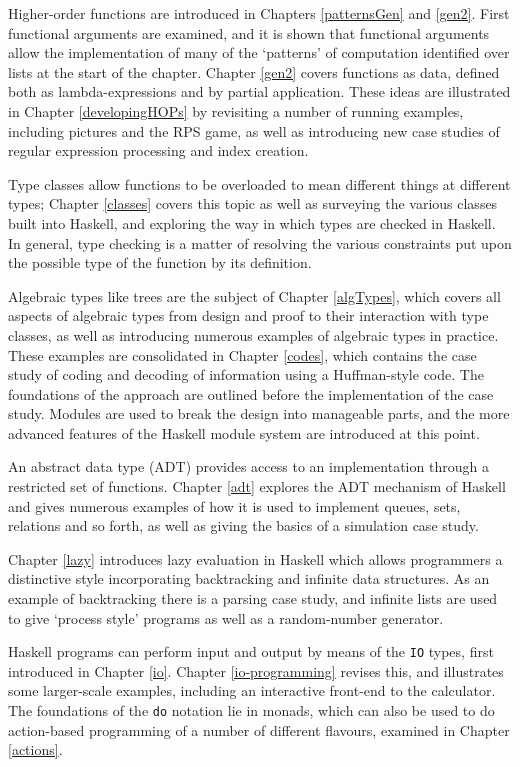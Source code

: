 Higher-order functions are introduced in Chapters \ref{patternsGen} and \ref{gen2}. First
functional arguments are examined, and it is shown that functional
arguments allow the implementation of many of the `patterns' of
computation identified over lists at the start of the chapter. Chapter
\ref{gen2} covers functions as data, defined both as lambda-expressions and
by partial application. These ideas are illustrated in Chapter \ref{developingHOPs} by revisiting a number of running examples, including pictures and the RPS game, as well as introducing new case studies of regular expression processing and index creation.

Type classes allow functions to be overloaded to mean different things
at different types; Chapter \ref{classes} covers this topic as well as surveying
the various classes built into Haskell, and exploring the way in which types are 
checked in Haskell. In general, type checking is a matter of resolving the various constraints put upon the
possible type of the function by its definition.

Algebraic types like trees are the subject of Chapter \ref{algTypes}, which covers
all aspects of algebraic types
from design and proof to their interaction with type classes, as well as
introducing
numerous examples of algebraic types in practice. 
These examples are consolidated in Chapter \ref{codes},
which contains the case study of coding and decoding of information
using a Huffman-style code. The foundations of the approach are
outlined before the implementation of the case study. Modules are used
to break the design into manageable parts, and the more advanced
features of the Haskell module system are introduced at this point.

An abstract data type (ADT) provides access to an implementation through a
restricted set of functions. Chapter \ref{adt} explores the ADT mechanism of
Haskell and gives numerous examples of how it is used to implement
queues, sets, relations and so forth, as well as giving the basics of
a simulation case study.

Chapter \ref{lazy} introduces lazy 
evaluation in Haskell which allows programmers a distinctive style
incorporating backtracking and infinite data structures.  As an
example of backtracking there is a parsing case study, and infinite
lists are used to give `process style' programs as well as a 
random-number generator.

Haskell programs can perform input and output by means of the \texttt{IO}
types, first introduced in Chapter \ref{io}. Chapter \ref{io-programming} revises this, and illustrates some larger-scale examples, including an
interactive front-end to the calculator. The foundations of the
\texttt{do} notation lie in monads, which can also be used to do
action-based programming of a number of different flavours, examined in
Chapter \ref{actions}.

